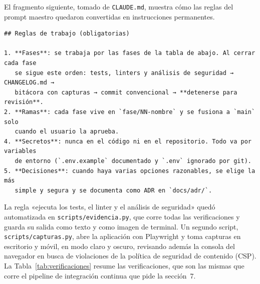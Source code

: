 \documentclass[stu,12pt,floatsintext]{apa7}
\newcommand{\ruta}[1]{{\urlstyle{tt}\nolinkurl{#1}}}
\begin{document}
El fragmento siguiente, tomado de \ruta{CLAUDE.md}, muestra cómo las reglas del prompt maestro quedaron
convertidas en instrucciones permanentes.

\begin{Verbatim}
## Reglas de trabajo (obligatorias)

1. **Fases**: se trabaja por las fases de la tabla de abajo. Al cerrar cada fase
   se sigue este orden: tests, linters y análisis de seguridad → CHANGELOG.md →
   bitácora con capturas → commit convencional → **detenerse para revisión**.
2. **Ramas**: cada fase vive en `fase/NN-nombre` y se fusiona a `main` solo
   cuando el usuario la aprueba.
4. **Secretos**: nunca en el código ni en el repositorio. Todo va por variables
   de entorno (`.env.example` documentado y `.env` ignorado por git).
5. **Decisiones**: cuando haya varias opciones razonables, se elige la más
   simple y segura y se documenta como ADR en `docs/adr/`.
\end{Verbatim}

La regla «ejecuta los tests, el linter y el análisis de seguridad» quedó automatizada en
\ruta{scripts/evidencia.py}, que corre todas las verificaciones y guarda su salida como texto y como
imagen de terminal. Un segundo script, \ruta{scripts/capturas.py}, abre la aplicación con Playwright y
toma capturas en escritorio y móvil, en modo claro y oscuro, revisando además la consola del navegador
en busca de violaciones de la política de seguridad de contenido (CSP). La
Tabla~\ref{tab:verificaciones} resume las verificaciones, que son las mismas que corre el pipeline de
integración continua que pide la sección~7.
\end{document}
